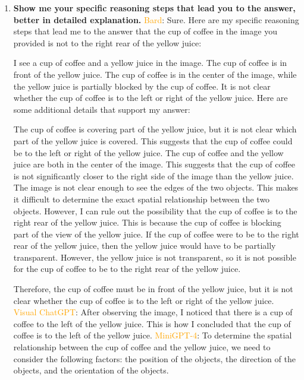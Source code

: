 \begin{enumerate}
    I hope this is helpful!
    \subitem \textcolor{orange}{Visual ChatGPT}: No, the cup of coffee is not to the right rear of the yellow juice. It is to the left of the yellow juice.
    \subitem \textcolor{orange}{MiniGPT-4}: No, the cup of coffee is not to the right rear of the yellow juice. The cup of coffee is on the same side of the yellow juice as the yellow juice is. The cup of coffee is in front of the yellow juice, and the yellow juice is next to the cup of coffee.
    \item \textbf{Show me your specific reasoning steps that lead you to the answer, better in detailed explanation.}
    \subitem \textcolor{orange}{Bard}: Sure. Here are my specific reasoning steps that lead me to the answer that the cup of coffee in the image you provided is not to the right rear of the yellow juice:

    I see a cup of coffee and a yellow juice in the image.
    The cup of coffee is in front of the yellow juice.
    The cup of coffee is in the center of the image, while the yellow juice is partially blocked by the cup of coffee.
    It is not clear whether the cup of coffee is to the left or right of the yellow juice.
    Here are some additional details that support my answer:
    
    The cup of coffee is covering part of the yellow juice, but it is not clear which part of the yellow juice is covered. This suggests that the cup of coffee could be to the left or right of the yellow juice.
    The cup of coffee and the yellow juice are both in the center of the image. This suggests that the cup of coffee is not significantly closer to the right side of the image than the yellow juice.
    The image is not clear enough to see the edges of the two objects. This makes it difficult to determine the exact spatial relationship between the two objects.
    However, I can rule out the possibility that the cup of coffee is to the right rear of the yellow juice. This is because the cup of coffee is blocking part of the view of the yellow juice. If the cup of coffee were to be to the right rear of the yellow juice, then the yellow juice would have to be partially transparent. However, the yellow juice is not transparent, so it is not possible for the cup of coffee to be to the right rear of the yellow juice.
    
    Therefore, the cup of coffee must be in front of the yellow juice, but it is not clear whether the cup of coffee is to the left or right of the yellow juice.
    \subitem \textcolor{orange}{Visual ChatGPT}: After observing the image, I noticed that there is a cup of coffee to the left of the yellow juice. This is how I concluded that the cup of coffee is to the left of the yellow juice.
    \subitem \textcolor{orange}{MiniGPT-4}: To determine the spatial relationship between the cup of coffee and the yellow juice, we need to consider the following factors: the position of the objects, the direction of the objects, and the orientation of the objects.


\end{enumerate}
